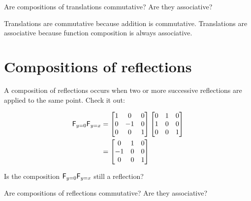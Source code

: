 \documentclass{ximera}
\begin{document}
\begin{question}
Are compositions of translations commutative?  Are they
associative?
\begin{prompt}
\begin{selectAll}
\end{selectAll}
\begin{feedback}
Translations are commutative because addition is commutative. Translations are associative because function composition is always associative. 
\end{feedback}
\end{prompt}
\end{question}



\section{Compositions of reflections}

A composition of reflections occurs when two or more successive
reflections are applied to the same point. Check it out:

\begin{align*}
\mathsf{F}_{y=0}\mathsf{F}_{y=x} &= \begin{bmatrix}
1 &  0 & 0\\
0 & -1 & 0\\
0 &  0 & 1
\end{bmatrix}
\begin{bmatrix}
0 & 1 & 0\\
1 & 0 & 0\\
0 & 0 & 1
\end{bmatrix}\\
&= \begin{bmatrix}
 0 & 1 & 0\\
-1 & 0 & 0\\
 0 & 0 & 1
\end{bmatrix}
\end{align*}


\begin{question}
Is the composition $\mathsf{F}_{y=0}\mathsf{F}_{y=x}$ still a reflection?
\end{question}


\begin{question}
Are compositions of reflections commutative?  Are they
associative?
\end{question}
\end{document}
